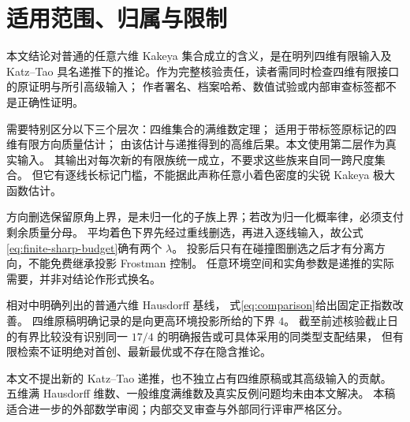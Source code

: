 \section{适用范围、归属与限制}\label{sec:scope}

本文结论对普通的任意六维 Kakeya 集合成立的含义，是在明列四维有限输入及
Katz--Tao 具名递推下的推论。作为完整核验责任，读者需同时检查四维有限接口的原证明与所引高级输入；
作者署名、档案哈希、数值试验或内部审查标签都不是正确性证明。

需要特别区分以下三个层次：四维集合的满维数定理；
适用于带标签原标记的四维有限方向质量估计；
由该估计与递推得到的高维后果。本文使用第二层作为真实输入。
其输出对每次新的有限族统一成立，不要求这些族来自同一跨尺度集合。
但它有逐线长标记门槛，不能据此声称任意小着色密度的尖锐 Kakeya 极大函数估计。

方向删选保留原角上界，是未归一化的子族上界；若改为归一化概率律，必须支付剩余质量分母。
平均着色下界先经过重线删选，再进入逐线输入，故公式\eqref{eq:finite-sharp-budget}确有两个 $\lambda$。
投影后只有在碰撞图删选之后才有分离方向，不能免费继承投影 Frostman 控制。
任意环境空间和实角参数是递推的实际需要，并非对结论作形式换名。

相对\cite{KT,HRZ,GLX}中明确列出的普通六维 Hausdorff 基线，
式\eqref{eq:comparison}给出固定正指数改善。
四维原稿\cite[Section 11.2]{OAI4}明确记录的是向更高环境投影所给的下界 $4$。
截至前述核验截止日的有界比较没有识别同一 $17/4$ 的明确报告或可具体采用的同类型支配结果，
但有限检索不证明绝对首创、最新最优或不存在隐含推论。

本文不提出新的 Katz--Tao 递推，也不独立占有四维原稿或其高级输入的贡献。
五维满 Hausdorff 维数、一般维度满维数及真实反例问题均未由本文解决。
本稿适合进一步的外部数学审阅；内部交叉审查与外部同行评审严格区分。
